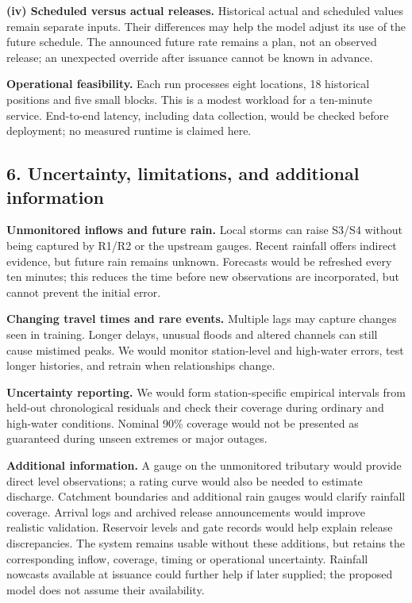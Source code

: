 \textbf{(iv) Scheduled versus actual releases.} Historical actual and scheduled values remain separate inputs. Their differences may help the model adjust its use of the future schedule. The announced future rate remains a plan, not an observed release; an unexpected override after issuance cannot be known in advance.

\textbf{Operational feasibility.} Each run processes eight locations, 18 historical positions and five small blocks. This is a modest workload for a ten-minute service. End-to-end latency, including data collection, would be checked before deployment; no measured runtime is claimed here.

\subsection*{6. Uncertainty, limitations, and additional information}
\textbf{Unmonitored inflows and future rain.} Local storms can raise S3/S4 without being captured by R1/R2 or the upstream gauges. Recent rainfall offers indirect evidence, but future rain remains unknown. Forecasts would be refreshed every ten minutes; this reduces the time before new observations are incorporated, but cannot prevent the initial error.

\textbf{Changing travel times and rare events.} Multiple lags may capture changes seen in training. Longer delays, unusual floods and altered channels can still cause mistimed peaks. We would monitor station-level and high-water errors, test longer histories, and retrain when relationships change.

\textbf{Uncertainty reporting.} We would form station-specific empirical intervals from held-out chronological residuals and check their coverage during ordinary and high-water conditions. Nominal 90\% coverage would not be presented as guaranteed during unseen extremes or major outages.

\textbf{Additional information.} A gauge on the unmonitored tributary would provide direct level observations; a rating curve would also be needed to estimate discharge. Catchment boundaries and additional rain gauges would clarify rainfall coverage. Arrival logs and archived release announcements would improve realistic validation. Reservoir levels and gate records would help explain release discrepancies. The system remains usable without these additions, but retains the corresponding inflow, coverage, timing or operational uncertainty. Rainfall nowcasts available at issuance could further help if later supplied; the proposed model does not assume their availability.

